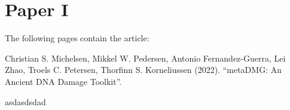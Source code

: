 \chapter{Paper I}
\label{chapter:metadmg}

The following pages contain the article:
\vspace*{1cm}


Christian S. Michelsen, Mikkel W. Pedersen, Antonio Fernandez-Guerra, Lei Zhao, Troels C. Petersen, Thorfinn S. Korneliussen (2022). ``metaDMG: An Ancient DNA Damage Toolkit''.

\clearpage

asdasdsdad

\clearpage
% 




